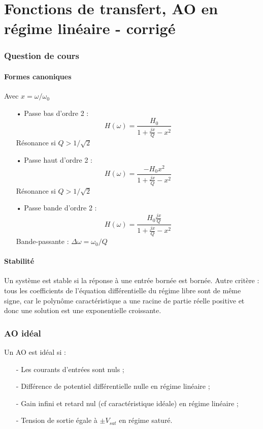\documentclass{report}
\begin{document}
\chapter{Fonctions de transfert, AO en régime linéaire - corrigé}

\newpage

\subsection*{Question de cours}

\subsubsection*{Formes canoniques}
Avec $x=\omega/\omega_0$ 
\begin{itemize}
	\item[•] Passe bas d'ordre 2 :
	\begin{equation}
		H(\omega)=\frac{H_0}{1+\frac{jx}{Q}-x^2}
	\end{equation}
	Résonance si $Q>1/\sqrt{2}$
	\item[•] Passe haut d'ordre 2 :
	\begin{equation}
		H(\omega)=\frac{-H_0x^2}{1+\frac{jx}{Q}-x^2}
	\end{equation}
	Résonance si $Q>1/\sqrt{2}$
	\item[•] Passe bande d'ordre 2 :
	\begin{equation}
		H(\omega)=\frac{H_0\frac{jx}{Q}}{1+\frac{jx}{Q}-x^2}
	\end{equation}
	Bande-passante : $\Delta\omega=\omega_0/Q$
\end{itemize}

\subsubsection*{Stabilité}
Un système est stable si la réponse à une entrée bornée est bornée. Autre critère : tous les coefficients de l'équation différentielle du régime libre sont de même signe, car le polynôme caractéristique a une racine de partie réelle positive et donc une solution est une exponentielle croissante.

\subsection*{AO idéal}

Un AO est idéal si : 
\begin{itemize}
	\item[-] Les courants d'entrées sont nuls ;
	\item[-] Différence de potentiel différentielle nulle en régime linéaire ;
	\item[-] Gain infini et retard nul (cf caractéristique idéale) en régime linéaire ;
	\item[-] Tension de sortie égale à $\pm V_{sat}$ en régime saturé.
	 
\end{itemize}
\end{document}
